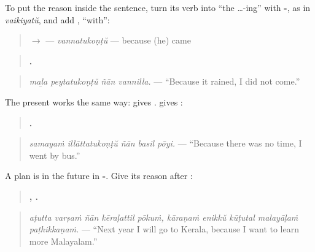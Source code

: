 \begin{grammarlens}[title={Grammar Lens: -\ml{അതുകൊണ്ട്} on a verb}]
To put the reason inside the sentence, turn its verb into \textquotedblleft{}the …-ing\textquotedblright{} with \textbf{-}, as in \emph{vaikiyatŭ}, and add \textbf{}, \textquotedblleft{}with\textquotedblright{}:

\begin{quote}
 $\to$ \textbf{} — \emph{vannatukoṇṭŭ} — because (he) came
\end{quote}

\begin{quote}
\textbf{   .}
\end{quote}

\begin{quote}
\emph{maḻa peytatukoṇṭŭ ñān vannilla.} — \textquotedblleft{}Because it rained, I did not come.\textquotedblright{}
\end{quote}

The present works the same way: \textbf{} gives \textbf{}. \textbf{} gives \textbf{}:

\begin{quote}
\textbf{    .}
\end{quote}

\begin{quote}
\emph{samayaṁ illāttatukoṇṭŭ ñān basil pōyi.} — \textquotedblleft{}Because there was no time, I went by bus.\textquotedblright{}
\end{quote}
\end{grammarlens}

\begin{grammarlens}[title={Grammar Lens: a plan and its reason}]
A plan is in the future in \textbf{-}. Give its reason after \textbf{}:

\begin{quote}
\textbf{    ,     .}
\end{quote}

\begin{quote}
\emph{aṭutta varṣaṁ ñān kēraḷattil pōkuṁ, kāraṇaṁ enikkŭ kūṭutal malayāḷaṁ paṭhikkaṇaṁ.} — \textquotedblleft{}Next year I will go to Kerala, because I want to learn more Malayalam.\textquotedblright{}
\end{quote}
\end{grammarlens}

